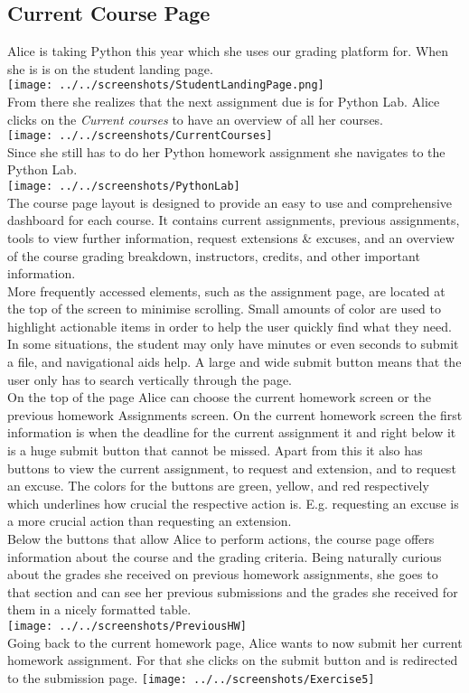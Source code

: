 \subsection{Current Course Page}

Alice is taking Python this year which she uses our grading platform for. When she is is on the student landing page.\\
\texttt{[image: ../../screenshots/StudentLandingPage.png]}\\
From there she realizes that the next assignment due is for Python Lab. Alice clicks on the \textit{Current courses} to have an overview of all her courses.\\
\texttt{[image: ../../screenshots/CurrentCourses]}\\
Since she still has to do her Python homework assignment she navigates to the Python Lab.\\
\texttt{[image: ../../screenshots/PythonLab]}\\
The course page layout is designed to provide an easy to use and comprehensive dashboard for each course. It contains current assignments, previous assignments, tools to view further information, request extensions \& excuses, and an overview of the course grading breakdown, instructors, credits, and other important information.\\

More frequently accessed elements, such as the assignment page, are located at the top of the screen to minimise scrolling. Small amounts of color are used to highlight actionable items in order to help the user quickly find what they need. In some situations, the student may only have minutes or even seconds to submit a file, and navigational aids help. A large and wide submit button means that the user only has to search vertically through the page.\\

On the top of the page Alice can choose the current homework screen or the previous homework Assignments screen. On the current homework screen the first information is when the deadline for the current assignment it and right below it is a huge submit button that cannot be missed. Apart from this it also has buttons to view the current assignment, to request and extension, and to request an excuse. The colors for the buttons are green, yellow, and red respectively which underlines how crucial the respective action is. E.g. requesting an excuse is a more crucial action than requesting an extension.\\
Below the buttons that allow Alice to perform actions, the course page offers information about the course and the grading criteria. Being naturally curious about the grades she received on previous homework assignments, she goes to that section and can see her previous submissions and the grades she received for them in a nicely formatted table.\\
\texttt{[image: ../../screenshots/PreviousHW]}\\
Going back to the current homework page, Alice wants to now submit her current homework assignment. For that she clicks on the submit button and is redirected to the submission page.
\texttt{[image: ../../screenshots/Exercise5]}

